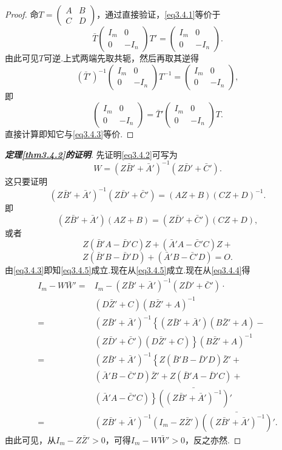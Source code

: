 \begin{proof}
	命$T=\begin{pmatrix}
		A & B\\
		C & D
	\end{pmatrix}$，通过直接验证，\eqref{eq3.4.1}等价于
\[\bar{T}\begin{pmatrix}
	I_m & 0\\
	0 & -I_n
\end{pmatrix}T'=\begin{pmatrix}
I_m & 0\\
0 & -I_n
\end{pmatrix}.\]
由此可见$T$可逆.上式两端先取共轭，然后再取其逆得
\[(\bar{T}')^{-1}\begin{pmatrix}
	I_m & 0\\
	0 & -I_n
\end{pmatrix}T^{-1}=\begin{pmatrix}
I_m & 0\\
0 & -I_n
\end{pmatrix},\]
即
\[\begin{pmatrix}
	I_m & 0\\
	0 & -I_n
\end{pmatrix}=\bar{T}'\begin{pmatrix}
I_m & 0\\
0 & -I_n
\end{pmatrix}T.\]
直接计算即知它与\eqref{eq3.4.3}等价.
\end{proof}
\begin{proof}[\textbf{定理\ref{thm3.4.2}的证明}]
	先证明\eqref{eq3.4.2}可写为
	\begin{equation}\label{eq3.4.4}
		W=(Z\bar{B}'+\bar{A}')^{-1}(Z\bar{D}'+\bar{C}').
	\end{equation}
这只要证明
\[(Z\bar{B}'+\bar{A}')^{-1}(Z\bar{D}'+\bar{C}')=(AZ+B)(CZ+D)^{-1}.\]
即
\[(Z\bar{B}'+\bar{A}')(AZ+B)=(Z\bar{D}'+\bar{C}')(CZ+D),\]
或者
\[Z(\bar{B}'A-\bar{D}'C)Z+(\bar{A}'A-\bar{C}'C)Z+\]
\begin{equation}\label{eq3.4.5}
	Z(\bar{B}'B-\bar{D}'D)+(\bar{A}'B-\bar{C}'D)=O.
\end{equation}
由\eqref{eq3.4.3}即知\eqref{eq3.4.5}成立.现在从\eqref{eq3.4.5}成立.现在从\eqref{eq3.4.4}得
\begin{align*}
	I_m-W\bar{W}'
	=&I_m-(Z\bar{B}'+\bar{A}')^{-1}(Z\bar{D}'+\bar{C}')\cdot\\
	&(D\bar{Z}'+C)(B\bar{Z}'+A)^{-1}\\
	=&(Z\bar{B}'+\bar{A}')^{-1}\left\{(Z\bar{B}'+\bar{A}')(B\bar{Z}'+A)-\right.\\
	&\left.(Z\bar{D}'+\bar{C}')(D\bar{Z}'+C)\right\}(B\bar{Z}'+A)^{-1}\\
	=&(Z\bar{B}'+\bar{A}')^{-1}\left\{Z(\bar{B}'B-\bar{D}'D)\bar{Z}'+\right.\\
	&\left.(\bar{A}'B-\bar{C}'D)\bar{Z}'+Z(\bar{B}'A-\bar{D}'C)+\right.\\
	&\left.(\bar{A}'A-\bar{C}'C)\right\}\bar{((Z\bar{B}'+\bar{A}')^{-1})}'\\
	=&(Z\bar{B}'+\bar{A}')^{-1}(I_m-Z\bar{Z}')\bar{((Z\bar{B}'+\bar{A}')^{-1})}'.
\end{align*}
由此可见，从$I_m-Z\bar{Z}'>0$，可得$I_m-W\bar{W}'>0$，反之亦然.
\end{proof}
